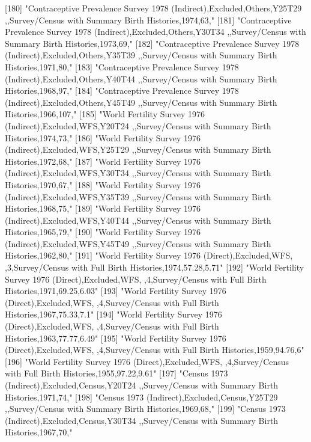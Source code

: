 [180] "Contraceptive Prevalence Survey 1978 (Indirect),Excluded,Others,Y25T29 ,,Survey/Census with Summary Birth Histories,1974,63," 
[181] "Contraceptive Prevalence Survey 1978 (Indirect),Excluded,Others,Y30T34 ,,Survey/Census with Summary Birth Histories,1973,69," 
[182] "Contraceptive Prevalence Survey 1978 (Indirect),Excluded,Others,Y35T39 ,,Survey/Census with Summary Birth Histories,1971,80," 
[183] "Contraceptive Prevalence Survey 1978 (Indirect),Excluded,Others,Y40T44 ,,Survey/Census with Summary Birth Histories,1968,97," 
[184] "Contraceptive Prevalence Survey 1978 (Indirect),Excluded,Others,Y45T49 ,,Survey/Census with Summary Birth Histories,1966,107,"
[185] "World Fertility Survey 1976 (Indirect),Excluded,WFS,Y20T24 ,,Survey/Census with Summary Birth Histories,1974,73,"             
[186] "World Fertility Survey 1976 (Indirect),Excluded,WFS,Y25T29 ,,Survey/Census with Summary Birth Histories,1972,68,"             
[187] "World Fertility Survey 1976 (Indirect),Excluded,WFS,Y30T34 ,,Survey/Census with Summary Birth Histories,1970,67,"             
[188] "World Fertility Survey 1976 (Indirect),Excluded,WFS,Y35T39 ,,Survey/Census with Summary Birth Histories,1968,75,"             
[189] "World Fertility Survey 1976 (Indirect),Excluded,WFS,Y40T44 ,,Survey/Census with Summary Birth Histories,1965,79,"             
[190] "World Fertility Survey 1976 (Indirect),Excluded,WFS,Y45T49 ,,Survey/Census with Summary Birth Histories,1962,80,"             
[191] "World Fertility Survey 1976 (Direct),Excluded,WFS, ,3,Survey/Census with Full Birth Histories,1974,57.28,5.71"                
[192] "World Fertility Survey 1976 (Direct),Excluded,WFS, ,4,Survey/Census with Full Birth Histories,1971,69.25,6.03"                
[193] "World Fertility Survey 1976 (Direct),Excluded,WFS, ,4,Survey/Census with Full Birth Histories,1967,75.33,7.1"                 
[194] "World Fertility Survey 1976 (Direct),Excluded,WFS, ,4,Survey/Census with Full Birth Histories,1963,77.77,6.49"                
[195] "World Fertility Survey 1976 (Direct),Excluded,WFS, ,4,Survey/Census with Full Birth Histories,1959,94.76,6"                   
[196] "World Fertility Survey 1976 (Direct),Excluded,WFS, ,4,Survey/Census with Full Birth Histories,1955,97.22,9.61"                
[197] "Census 1973 (Indirect),Excluded,Census,Y20T24 ,,Survey/Census with Summary Birth Histories,1971,74,"                          
[198] "Census 1973 (Indirect),Excluded,Census,Y25T29 ,,Survey/Census with Summary Birth Histories,1969,68,"                          
[199] "Census 1973 (Indirect),Excluded,Census,Y30T34 ,,Survey/Census with Summary Birth Histories,1967,70,"                          
